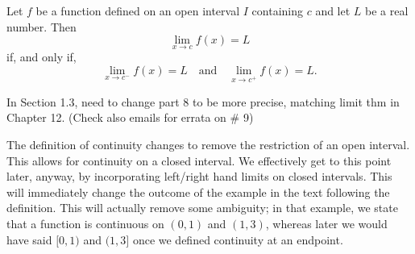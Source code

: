 \documentclass{article}
\begin{document}
{Let $f$ be a function defined on an open interval $I$ containing $c$ and let $L$ be a real number.  Then $$\lim_{x\to c}f(x) = L$$ if, and only if, $$\lim_{x\to c^-}f(x) = L \quad \text{and} \quad \lim_{x\to c^+}f(x) = L.$$}

In Section 1.3, need to change part 8 to be more precise, matching limit thm in Chapter 12. (Check also emails for errata on \# 9)


The definition of continuity changes to remove the restriction of an open interval. This allows for continuity on a closed interval. We effectively get to this point later, anyway, by incorporating left/right hand limits on closed intervals. This will immediately change the outcome of the example in the text following the definition. This will actually remove some ambiguity; in that example, we state that a function is continuous on $(0,1)$ and $(1,3)$, whereas later we would have said $[0,1)$ and $(1,3]$ once we defined continuity at an endpoint.
\end{document}
